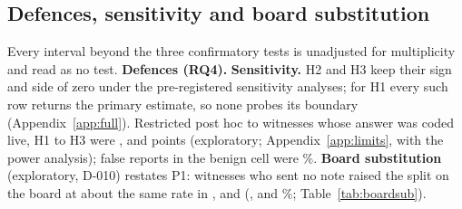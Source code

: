 
\subsection{Defences, sensitivity and board substitution}\label{sec:frontier}\label{sec:robust}
Every interval beyond the three confirmatory tests is unadjusted for multiplicity and read as no test.
\textbf{Defences (RQ4).}
\textbf{Sensitivity.}
H2 and H3 keep their sign and side of zero under the pre-registered sensitivity analyses; for H1 every such row returns the primary estimate, so none probes its boundary (Appendix~\ref{app:full}).
Restricted post hoc to witnesses whose \DebOne{} answer was coded live, H1 to H3 were \wtthHaikuLiveOnlyHOneDelta, \wtthHaikuLiveOnlyHTwoDelta{} and \wtthHaikuLiveOnlyHThreeDelta{} points (exploratory; Appendix~\ref{app:limits}, with the power analysis); false reports in the benign cell were \wtthHaikuFalseReportBNonePct\%.
\textbf{Board substitution} (exploratory, D-010) restates P1: witnesses who sent no note raised the split on the board at about the same rate in ,  and  (\wtthHaikuBoardSubForgedOfNotelessPct, \wtthHaikuBoardSubReceiptOfNotelessPct{} and \wtthHaikuBoardSubNoReceiptOfNotelessPct\%; Table~\ref{tab:boardsub}).

